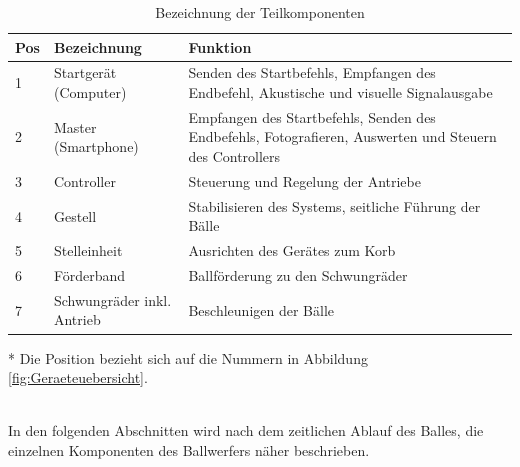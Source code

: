 \begin{table}[h!]
	\begin{threeparttable} 
		\begin{tabular}{p{8mm}p{3.5cm}p{8.1cm}}
		    \textbf{Pos}\tnote{*} & \textbf{Bezeichnung} & \textbf{Funktion} \\ 
			\hline\rule{0pt}{11pt} 1 & Startgerät (Computer) & Senden des Startbefehls, Empfangen des Endbefehl, 
			Akustische und visuelle Signalausgabe \\ 
			    \rule{0pt}{11pt}   2 & Master  (Smartphone) & Empfangen des Startbefehls, Senden des Endbefehls,
			Fotografieren, Auswerten und Steuern des Controllers \\ 
			  \rule{0pt}{11pt}     3 & Controller & Steuerung und Regelung der Antriebe \\ 
			  \rule{0pt}{11pt}     4 & Gestell & Stabilisieren des Systems,	seitliche Führung der Bälle \\ 
			   \rule{0pt}{11pt}    5 & Stelleinheit & Ausrichten des Gerätes zum Korb \\ 
			   \rule{0pt}{11pt}    6 & Förderband & Ballförderung zu den Schwungräder \\ 
			   \rule{0pt}{11pt}    7 & Schwungräder inkl. Antrieb & Beschleunigen der Bälle \\ 
		\end{tabular} 
		\centering
		\caption{Bezeichnung der Teilkomponenten}	
		\label{tab:BezTeilkomponenten}
		\begin{tablenotes}\footnotesize 
			\item[*] Die Position bezieht sich auf die Nummern in Abbildung \ref{fig:Geraeteuebersicht}.
		\end{tablenotes}
	\end{threeparttable} 
\end{table}\\
In den folgenden Abschnitten wird nach dem zeitlichen Ablauf des Balles, die einzelnen Komponenten des Ballwerfers näher beschrieben. 